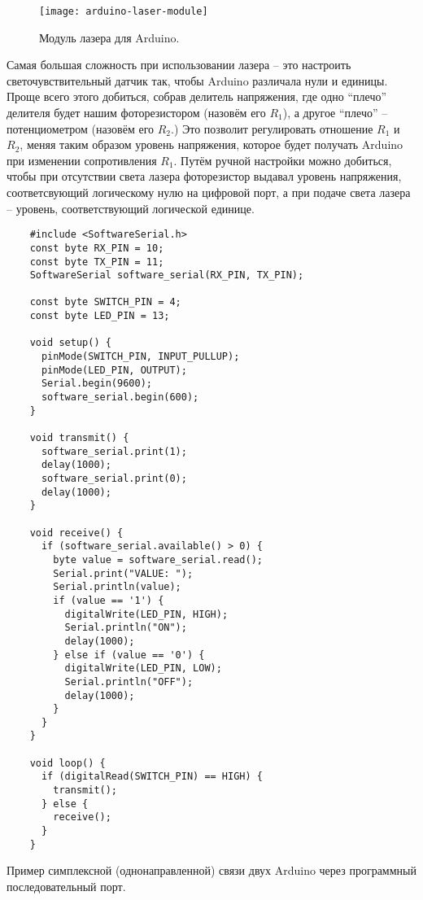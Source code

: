 \documentclass[../sparc.tex]{subfiles}
\begin{document}
\begin{figure}[ht]
  \centering
  \texttt{[image: arduino-laser-module]}
  \caption{Модуль лазера для Arduino.}
  \label{fig:arduino-laser-module}
\end{figure}


Самая большая сложность при использовании лазера -- это настроить
светочувствительный датчик так, чтобы Arduino различала нули и единицы.  Проще
всего этого добиться, собрав делитель напряжения, где одно ``плечо'' делителя
будет нашим фоторезистором (назовём его $R_1$), а другое ``плечо'' --
потенциометром (назовём его $R_2$.)  Это позволит регулировать отношение $R_1$ и
$R_2$, меняя таким образом уровень напряжения, которое будет получать Arduino
при изменении сопротивления $R_1$.  Путём ручной настройки можно добиться, чтобы
при отсутствии света лазера фоторезистор выдавал уровень напряжения,
соответсвующий логическому нулю на цифровой порт, а при подаче света лазера --
уровень, соответствующий логической единице.

\begin{listing}[H]
  \begin{verbatim}
    #include <SoftwareSerial.h>
    const byte RX_PIN = 10;
    const byte TX_PIN = 11;
    SoftwareSerial software_serial(RX_PIN, TX_PIN);

    const byte SWITCH_PIN = 4;
    const byte LED_PIN = 13;

    void setup() {
      pinMode(SWITCH_PIN, INPUT_PULLUP);
      pinMode(LED_PIN, OUTPUT);
      Serial.begin(9600);
      software_serial.begin(600);
    }

    void transmit() {
      software_serial.print(1);
      delay(1000);
      software_serial.print(0);
      delay(1000);
    }

    void receive() {
      if (software_serial.available() > 0) {
        byte value = software_serial.read();
        Serial.print("VALUE: ");
        Serial.println(value);
        if (value == '1') {
          digitalWrite(LED_PIN, HIGH);
          Serial.println("ON");
          delay(1000);
        } else if (value == '0') {
          digitalWrite(LED_PIN, LOW);
          Serial.println("OFF");
          delay(1000);
        }
      }
    }

    void loop() {
      if (digitalRead(SWITCH_PIN) == HIGH) {
        transmit();
      } else {
        receive();
      }
    }
  \end{verbatim}
  \label{listing:communication-serial-two-arduino-example}
  \caption{Пример симплексной (однонаправленной) связи двух Arduino через
    программный последовательный порт.}
\end{listing}
\end{document}
